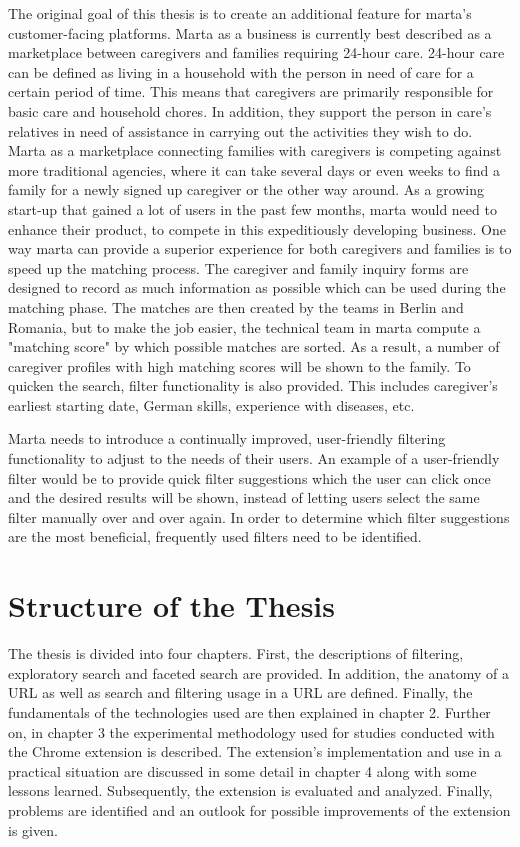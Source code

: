 The original goal of this thesis is to create an additional feature for marta's customer-facing platforms. Marta as a business is currently best described as a marketplace between caregivers and families requiring 24-hour care. 24-hour care can be defined as living in a household with the person in need of care for a certain period of time. This means that caregivers are primarily responsible for basic care and household chores. In addition, they support the person in care's relatives in need of assistance in carrying out the activities they wish to do. Marta as a marketplace connecting families with caregivers is competing against more traditional agencies, where it can take several days or even weeks to find a family for a newly signed up caregiver or the other way around. As a growing start-up that gained a lot of users in the past few months, marta would need to enhance their product, to compete in this expeditiously developing business. One way marta can provide a superior experience for both caregivers and families is to speed up the matching process. The caregiver and family inquiry forms are designed to record as much information as possible which can be used during the matching phase. The matches are then created by the teams in Berlin and Romania, but to make the job easier, the technical team in marta compute a "matching score" by which possible matches are sorted. As a result, a number of caregiver profiles with high matching scores will be shown to the family. To quicken the search, filter functionality is also provided. This includes caregiver's earliest starting date, German skills, experience with diseases, etc.

Marta needs to introduce a continually improved, user-friendly filtering functionality to adjust to the needs of their users. An example of a user-friendly filter would be to provide quick filter suggestions which the user can click once and the desired results will be shown, instead of letting users select the same filter manually over and over again. In order to determine which filter suggestions are the most beneficial, frequently used filters need to be identified.

\section{Structure of the Thesis}
The thesis is divided into four chapters. First, the descriptions of filtering, exploratory search and faceted search are provided. In addition, the anatomy of a URL as well as search and filtering usage in a URL are defined. Finally, the fundamentals of the technologies used are then explained in chapter 2. Further on, in chapter 3 the experimental methodology used for studies conducted with the Chrome extension is described. The extension's implementation and use in a practical situation are discussed in some detail in chapter 4 along with some lessons learned. Subsequently, the extension is evaluated and analyzed. Finally, problems are identified and an outlook for possible improvements of the extension is given.
